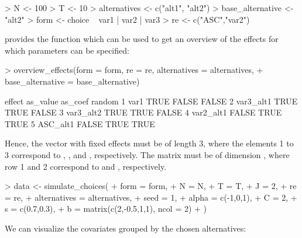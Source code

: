 \documentclass[article]{jss}
\newcommand{\fct}[1]{\code{#1()}}
\begin{document}
\begin{Schunk}
\begin{Sinput}
> N <- 100
> T <- 10
> alternatives <- c("alt1", "alt2")
> base_alternative <- "alt2"
> form <- choice ~ var1 | var2 | var3
> re <- c("ASC","var2")
\end{Sinput}
\end{Schunk}

 provides the function \fct{overview\_effects} which can be used to get an overview of the effects for which parameters can be specified:

\begin{Schunk}
\begin{Sinput}
> overview_effects(form = form, re = re, alternatives = alternatives,
+                   base_alternative = base_alternative)
\end{Sinput}
\begin{Soutput}
     effect as_value as_coef random
1      var1     TRUE   FALSE  FALSE
2 var3_alt1     TRUE    TRUE  FALSE
3 var3_alt2     TRUE    TRUE  FALSE
4 var2_alt1    FALSE    TRUE   TRUE
5  ASC_alt1    FALSE    TRUE   TRUE
\end{Soutput}
\end{Schunk}

Hence, the vector  with fixed effects must be of length 3, where the elements 1 to 3 correspond to , , and , respectively. The matrix  must be of dimension , where row 1 and 2 correspond to  and , respectively.

\begin{Schunk}
\begin{Sinput}
> data <- simulate_choices(
+    form = form,
+    N = N,
+    T = T,
+    J = 2,
+    re = re,
+    alternatives = alternatives,
+    seed = 1,
+    alpha = c(-1,0,1),
+    C = 2,
+    s = c(0.7,0.3),
+    b = matrix(c(2,-0.5,1,1), ncol = 2)
+  )
\end{Sinput}
\end{Schunk}

We can visualize the covariates grouped by the chosen alternatives:
\end{document}

